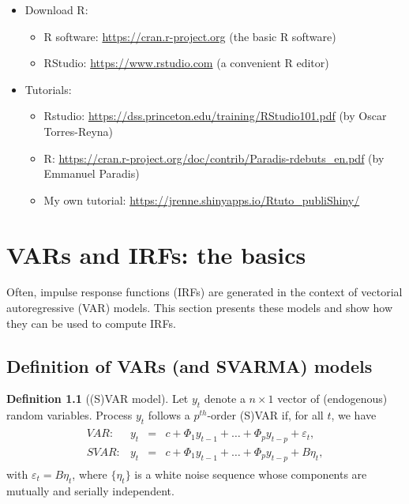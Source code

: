 \documentclass[
  12pt,
]{book}
\providecommand{\tightlist}{%
  \setlength{\itemsep}{0pt}\setlength{\parskip}{0pt}}
\theoremstyle{definition}
\newtheorem{definition}{Definition}[chapter]
\theoremstyle{definition}
\theoremstyle{definition}
\theoremstyle{definition}
\theoremstyle{remark}
\begin{document}
\begin{itemize}
\item
  Download R:

  \begin{itemize}
  \tightlist
  \item
    R software: \url{https://cran.r-project.org} (the basic R software)
  \item
    RStudio: \url{https://www.rstudio.com} (a convenient R editor)
  \end{itemize}
\item
  Tutorials:

  \begin{itemize}
  \tightlist
  \item
    Rstudio: \url{https://dss.princeton.edu/training/RStudio101.pdf} (by Oscar Torres-Reyna)
  \item
    R: \url{https://cran.r-project.org/doc/contrib/Paradis-rdebuts_en.pdf} (by Emmanuel Paradis)
  \item
    My own tutorial: \url{https://jrenne.shinyapps.io/Rtuto_publiShiny/}
  \end{itemize}
\end{itemize}

\hypertarget{basics}{%
\chapter{VARs and IRFs: the basics}\label{basics}}

Often, impulse response functions (IRFs) are generated in the context of vectorial autoregressive (VAR) models. This section presents these models and show how they can be used to compute IRFs.

\hypertarget{definition-of-vars-and-svarma-models}{%
\section{Definition of VARs (and SVARMA) models}\label{definition-of-vars-and-svarma-models}}

\begin{definition}[(S)VAR model]
\protect\hypertarget{def:SVAR}{}\label{def:SVAR}Let \(y_{t}\) denote a \(n \times1\) vector of (endogenous) random variables. Process \(y_{t}\) follows a \(p^{th}\)-order (S)VAR if, for all \(t\), we have
\begin{eqnarray}
\begin{array}{rllll}
VAR:& y_t &=& c + \Phi_1 y_{t-1} + \dots + \Phi_p y_{t-p} + \varepsilon_t,\\
SVAR:& y_t &=& c + \Phi_1 y_{t-1} + \dots + \Phi_p y_{t-p} + B \eta_t,
\end{array}\label{eq:yVAR}
\end{eqnarray}
with \(\varepsilon_t = B\eta_t\), where \(\{\eta_{t}\}\) is a white noise sequence whose components are mutually and serially independent.
\end{definition}
\end{document}

